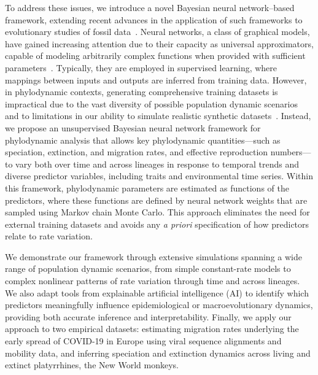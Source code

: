 To address these issues, we introduce a novel Bayesian neural network–based framework, extending recent advances in the application of such frameworks to evolutionary studies of fossil data~\cite{hauffe2024trait}.
Neural networks, a class of graphical models, have gained increasing attention due to their capacity as universal approximators, capable of modeling arbitrarily complex functions when provided with sufficient parameters~\cite{haykin1994neural}. 
Typically, they are employed in supervised learning, where mappings between inputs and outputs are inferred from training data. 
However, in phylodynamic contexts, generating comprehensive training datasets is impractical due to the vast diversity of possible population dynamic scenarios and to limitations in our ability to simulate realistic synthetic  datasets~\cite{trost2024simulations}. 
Instead, we propose an unsupervised Bayesian neural network framework for phylodynamic analysis that allows key phylodynamic quantities---such as speciation, extinction, and migration rates, and effective reproduction numbers---to vary both over time and across lineages in response to temporal trends and diverse predictor variables, including traits and environmental time series.
Within this framework, phylodynamic parameters are estimated as functions of the predictors, where these functions are defined by neural network weights that are sampled using Markov chain Monte Carlo. This approach eliminates the need for external training datasets and avoids any \textit{a priori} specification of how predictors relate to rate variation.

We demonstrate our framework through extensive simulations spanning a wide range of population dynamic scenarios, from simple constant-rate models to complex nonlinear patterns of rate variation through time and across lineages.
We also adapt tools from explainable artificial intelligence (AI) to identify which predictors meaningfully influence epidemiological or macroevolutionary dynamics, providing both accurate inference and interpretability.
Finally, we apply our approach to two empirical datasets: estimating migration rates underlying the early spread of COVID-19 in Europe using viral sequence alignments and mobility data, and inferring speciation and extinction dynamics across living and extinct platyrrhines, the New World monkeys.
